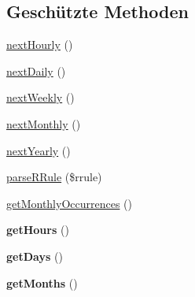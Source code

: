 \subsection*{Geschützte Methoden}
\begin{DoxyCompactItemize}
\item 
\mbox{\hyperlink{class_sabre_1_1_v_object_1_1_recur_1_1_r_rule_iterator_a2f54cf787fc730060cdcc7718c1abe10}{next\+Hourly}} ()
\item 
\mbox{\hyperlink{class_sabre_1_1_v_object_1_1_recur_1_1_r_rule_iterator_a08a207346d968908ab3cd2f6dfd40c19}{next\+Daily}} ()
\item 
\mbox{\hyperlink{class_sabre_1_1_v_object_1_1_recur_1_1_r_rule_iterator_ab88b16a96ed84b73492580920b59263b}{next\+Weekly}} ()
\item 
\mbox{\hyperlink{class_sabre_1_1_v_object_1_1_recur_1_1_r_rule_iterator_a1ad52feeb9962ea005c99a67ccfd92a5}{next\+Monthly}} ()
\item 
\mbox{\hyperlink{class_sabre_1_1_v_object_1_1_recur_1_1_r_rule_iterator_ad7722aa2d9f9b5afe25a1842f78dc728}{next\+Yearly}} ()
\item 
\mbox{\hyperlink{class_sabre_1_1_v_object_1_1_recur_1_1_r_rule_iterator_aee971dcab644f894b63c6dfaeabbc9f1}{parse\+R\+Rule}} (\$rrule)
\item 
\mbox{\hyperlink{class_sabre_1_1_v_object_1_1_recur_1_1_r_rule_iterator_a6a83ccfbb7c027bae54371c4f94b3644}{get\+Monthly\+Occurrences}} ()
\item 
\mbox{\label{class_sabre_1_1_v_object_1_1_recur_1_1_r_rule_iterator_aee83cbb8220d32445d1e963052b20b59}} 
{\bfseries get\+Hours} ()
\item 
\mbox{\label{class_sabre_1_1_v_object_1_1_recur_1_1_r_rule_iterator_aab179e5e1081c738d00062a84774f425}} 
{\bfseries get\+Days} ()
\item 
\mbox{\label{class_sabre_1_1_v_object_1_1_recur_1_1_r_rule_iterator_a91d9e6ef08dba1731ddede0f3bcfd9cc}} 
{\bfseries get\+Months} ()
\end{DoxyCompactItemize}
